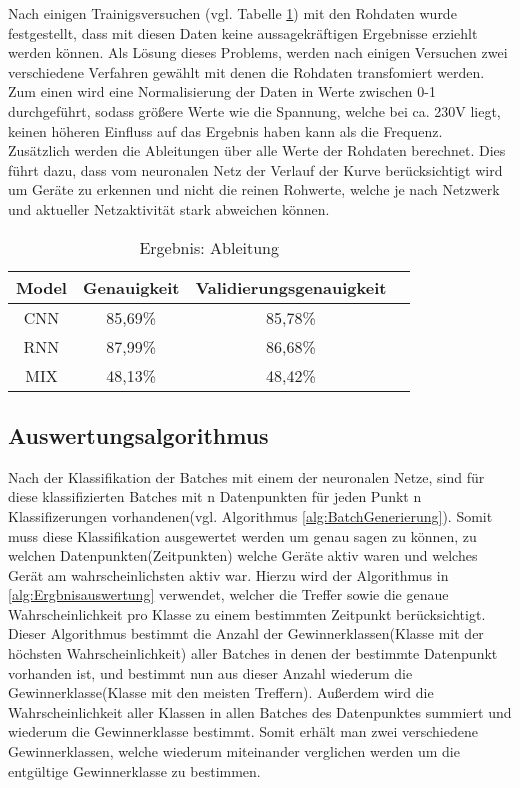     \noindent
    Nach einigen Trainigsversuchen (vgl. Tabelle \ref{tabl:ErgebnisAbleitung}) mit den Rohdaten wurde festgestellt, dass mit diesen Daten keine aussagekräftigen Ergebnisse erziehlt werden können.
    Als Lösung dieses Problems, werden nach einigen Versuchen zwei verschiedene Verfahren gewählt mit denen die Rohdaten transfomiert werden. \\
    \noindent
    Zum einen wird eine Normalisierung der Daten in Werte zwischen 0-1 durchgeführt, sodass größere Werte wie die Spannung, welche bei ca. 230V liegt, keinen höheren Einfluss auf das Ergebnis haben kann als die Frequenz.\\
    \noindent
    Zusätzlich werden die Ableitungen über alle Werte der Rohdaten berechnet.
    Dies führt dazu, dass vom neuronalen Netz der Verlauf der Kurve berücksichtigt wird um Geräte zu erkennen und nicht die reinen Rohwerte, welche je nach Netzwerk und aktueller Netzaktivität stark abweichen können.

    \begin{table}[H]
        \centering
        \begin{tabular}{|c|c|c|c|}
            \hline
            Model & Genauigkeit & Validierungsgenauigkeit \\
            \hline
            CNN & 85,69\% & 85,78\% \\
            \hline
            RNN & 87,99\% & 86,68\% \\
            \hline
            MIX & 48,13\% & 48,42\% \\
            \hline
        \end{tabular}
        \caption{Ergebnis: Ableitung}
        \label{tabl:ErgebnisAbleitung}
    \end{table}

    \subsection{Auswertungsalgorithmus}\label{Auswertungsalgorithmus}
    Nach der Klassifikation der Batches mit einem der neuronalen Netze, sind für diese klassifizierten Batches mit n Datenpunkten für jeden Punkt n Klassifizerungen vorhandenen(vgl. Algorithmus \ref{alg:BatchGenerierung}).
    Somit muss diese Klassifikation ausgewertet werden um genau sagen zu können, zu welchen Datenpunkten(Zeitpunkten) welche Geräte aktiv waren und welches Gerät am wahrscheinlichsten aktiv war.
    Hierzu wird der Algorithmus in \ref{alg:Ergbnisauswertung} verwendet, welcher die Treffer sowie die genaue Wahrscheinlichkeit pro Klasse zu einem bestimmten Zeitpunkt berücksichtigt. 
    Dieser Algorithmus bestimmt die Anzahl der Gewinnerklassen(Klasse mit der höchsten Wahrscheinlichkeit) aller Batches in denen der bestimmte Datenpunkt vorhanden ist, und bestimmt nun aus dieser Anzahl wiederum die Gewinnerklasse(Klasse mit den meisten Treffern).
    Außerdem wird die Wahrscheinlichkeit aller Klassen in allen Batches des Datenpunktes summiert und wiederum die Gewinnerklasse bestimmt.
    Somit erhält man zwei verschiedene Gewinnerklassen, welche wiederum miteinander verglichen werden um die entgültige Gewinnerklasse zu bestimmen.

